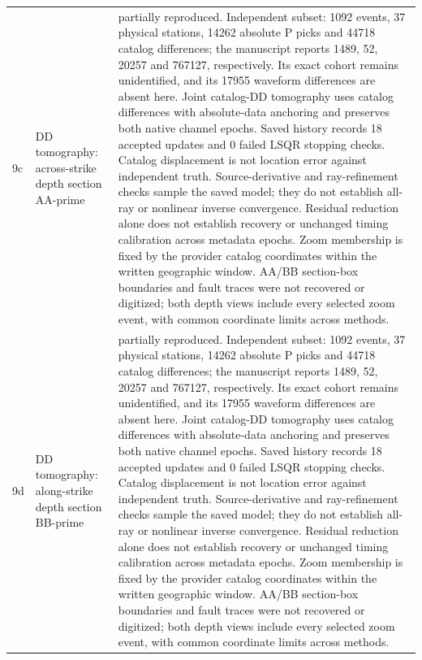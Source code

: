\begin{longtable}{>{\raggedright\arraybackslash}p{}>{\raggedright\arraybackslash}p{}>{\raggedright\arraybackslash}p{}}
9c & DD tomography: across-strike depth section AA-prime & partially reproduced. Independent subset: 1092 events, 37 physical stations, 14262 absolute P picks and 44718 catalog differences; the manuscript reports 1489, 52, 20257 and 767127, respectively. Its exact cohort remains unidentified, and its 17955 waveform differences are absent here. Joint catalog-DD tomography uses catalog differences with absolute-data anchoring and preserves both native channel epochs. Saved history records 18 accepted updates and 0 failed LSQR stopping checks. Catalog displacement is not location error against independent truth. Source-derivative and ray-refinement checks sample the saved model; they do not establish all-ray or nonlinear inverse convergence. Residual reduction alone does not establish recovery or unchanged timing calibration across metadata epochs. Zoom membership is fixed by the provider catalog coordinates within the written geographic window. AA/BB section-box boundaries and fault traces were not recovered or digitized; both depth views include every selected zoom event, with common coordinate limits across methods.\\
9d & DD tomography: along-strike depth section BB-prime & partially reproduced. Independent subset: 1092 events, 37 physical stations, 14262 absolute P picks and 44718 catalog differences; the manuscript reports 1489, 52, 20257 and 767127, respectively. Its exact cohort remains unidentified, and its 17955 waveform differences are absent here. Joint catalog-DD tomography uses catalog differences with absolute-data anchoring and preserves both native channel epochs. Saved history records 18 accepted updates and 0 failed LSQR stopping checks. Catalog displacement is not location error against independent truth. Source-derivative and ray-refinement checks sample the saved model; they do not establish all-ray or nonlinear inverse convergence. Residual reduction alone does not establish recovery or unchanged timing calibration across metadata epochs. Zoom membership is fixed by the provider catalog coordinates within the written geographic window. AA/BB section-box boundaries and fault traces were not recovered or digitized; both depth views include every selected zoom event, with common coordinate limits across methods.\\

\end{longtable}
